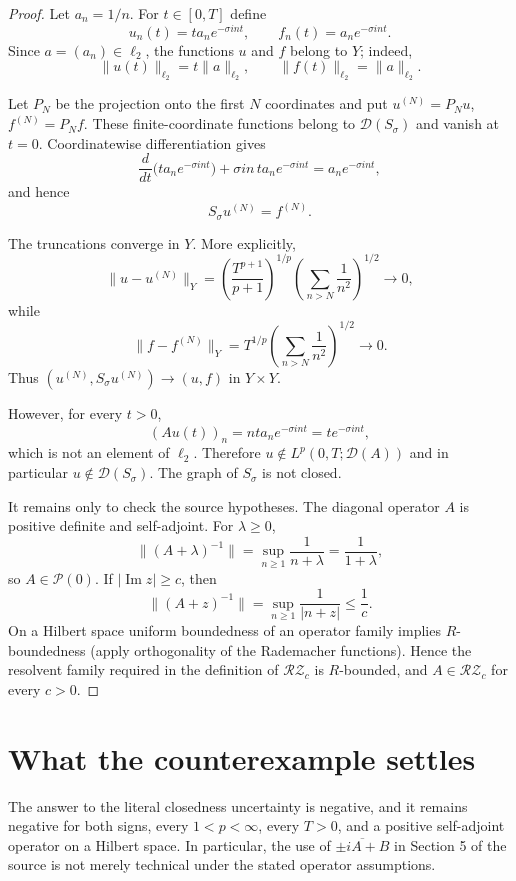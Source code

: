 \documentclass[11pt]{article}
\newcommand{\D}{\mathcal D}
\newcommand{\RZ}{\mathcal{RZ}}
\begin{document}
\begin{proof}
Let $a_n=1/n$.  For $t\in[0,T]$ define
\[
  u_n(t)=t a_n e^{-\sigma int},
  \qquad
  f_n(t)=a_n e^{-\sigma int}.
\]
Since $a=(a_n)\in\ell_2$, the functions $u$ and $f$ belong to $Y$; indeed,
\[
  \|u(t)\|_{\ell_2}=t\|a\|_{\ell_2},
  \qquad
  \|f(t)\|_{\ell_2}=\|a\|_{\ell_2}.
\]

Let $P_N$ be the projection onto the first $N$ coordinates and put
$u^{(N)}=P_Nu$, $f^{(N)}=P_Nf$.  These finite-coordinate functions belong to
$\D(S_\sigma)$ and vanish at $t=0$.  Coordinatewise differentiation gives
\[
  \frac{d}{dt}\bigl(t a_ne^{-\sigma int}\bigr)
  +\sigma in\,t a_ne^{-\sigma int}
  =a_ne^{-\sigma int},
\]
and hence
\[
  S_\sigma u^{(N)}=f^{(N)}.
\]

The truncations converge in $Y$.  More explicitly,
\[
 \|u-u^{(N)}\|_Y
 =\left(\frac{T^{p+1}}{p+1}\right)^{1/p}
   \left(\sum_{n>N}\frac1{n^2}\right)^{1/2}\longrightarrow0,
\]
while
\[
 \|f-f^{(N)}\|_Y
 =T^{1/p}\left(\sum_{n>N}\frac1{n^2}\right)^{1/2}
 \longrightarrow0.
\]
Thus $(u^{(N)},S_\sigma u^{(N)})\to(u,f)$ in $Y\times Y$.

However, for every $t>0$,
\[
  (Au(t))_n=nt a_ne^{-\sigma int}=t e^{-\sigma int},
\]
which is not an element of $\ell_2$.  Therefore
$u\notin L^p(0,T;\D(A))$ and in particular $u\notin\D(S_\sigma)$.  The graph
of $S_\sigma$ is not closed.

It remains only to check the source hypotheses.  The diagonal operator $A$ is
positive definite and self-adjoint.  For $\lambda\ge0$,
\[
  \|(A+\lambda)^{-1}\|=\sup_{n\ge1}\frac1{n+\lambda}
  =\frac1{1+\lambda},
\]
so $A\in\mathcal P(0)$.  If $|\operatorname{Im}z|\ge c$, then
\[
  \|(A+z)^{-1}\|=\sup_{n\ge1}\frac1{|n+z|}\le\frac1c.
\]
On a Hilbert space uniform boundedness of an operator family implies
$R$-boundedness (apply orthogonality of the Rademacher functions).  Hence the
resolvent family required in the definition of $\RZ_c$ is $R$-bounded, and
$A\in\RZ_c$ for every $c>0$.
\end{proof}

\section{What the counterexample settles}
The answer to the literal closedness uncertainty is negative, and it remains
negative for both signs, every $1<p<\infty$, every $T>0$, and a positive
self-adjoint operator on a Hilbert space.  In particular, the use of
$\overline{\pm iA+B}$ in Section 5 of the source is not merely technical under
the stated operator assumptions.
\end{document}
